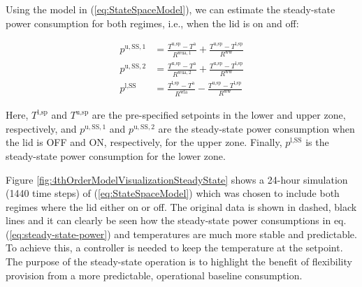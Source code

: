 \documentclass[lettersize,journal]{IEEEtran}
\begin{document}
Using the model in (\ref{eq:StateSpaceModel}), we can estimate the steady-state power consumption for both regimes, i.e., when the lid is on and off:

\begin{subequations}\label{eq:steady-state-power}
    \begin{align}
        p^{\text{u},\text{SS},1} & = \frac{T^{\text{u},\text{sp}} - T^{\text{a}}}{R^{\text{wua},1}}  + \frac{T^{\text{u},\text{sp}}-T^{\text{l},\text{sp}}}{R^{\text{ww}}} \label{eq1:steady-state-power} \\
        p^{\text{u},\text{SS},2} & = \frac{T^{\text{u},\text{sp}} - T^{\text{a}}}{R^{\text{wua},2}} + \frac{T^{\text{u},\text{sp}}-T^{\text{l},\text{sp}}}{R^{\text{ww}}} \label{eq2:steady-state-power}  \\
        p^{\text{l},\text{SS}}   & = \frac{T^{\text{l},\text{sp}} - T^{\text{a}}}{R^{\text{wla}}} - \frac{T^{\text{u},\text{sp}}-T^{\text{l},\text{sp}}}{R^{\text{ww}}} \label{eq3:steady-state-power}
    \end{align}
\end{subequations}

Here, $T^{\text{l},\text{sp}}$ and $T^{\text{u},\text{sp}}$ are the pre-specified setpoints in the lower and upper zone, respectively, and $p^{\text{u},\text{SS},1}$ and $p^{\text{u},\text{SS},2}$ are the steady-state power consumption when the lid is OFF and ON, respectively, for the upper zone. Finally, $p^{\text{l},\text{SS}}$ is the steady-state power consumption for the lower zone.

Figure \ref{fig:4thOrderModelVisualizationSteadyState} shows a 24-hour simulation (1440 time steps) of (\ref{eq:StateSpaceModel}) which was chosen to include both regimes where the lid either on or off. The original data is shown in dashed, black lines and it can clearly be seen how the steady-state power consumptions in eq. (\ref{eq:steady-state-power}) and temperatures are much more stable and predictable. To achieve this, a controller is needed to keep the temperature at the setpoint. The purpose of the steady-state operation is to highlight the benefit of flexibility provision from a more predictable, operational baseline consumption.
\end{document}
